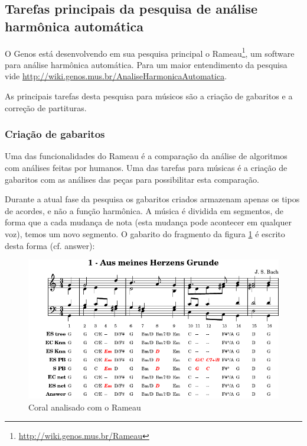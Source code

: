 \documentclass[12pt,brazil]{book}
\begin{document}
\subsection{Tarefas principais da pesquisa de análise harmônica automática}
\label{sec:taref-princ-da}

O Genos está desenvolvendo em sua pesquisa principal o
Rameau\footnote{\url{http://wiki.genos.mus.br/Rameau}}, um software
para análise harmônica automática. Para um maior entendimento da
pesquisa vide
\url{http://wiki.genos.mus.br/AnaliseHarmonicaAutomatica}.

As principais tarefas desta pesquisa para músicos são a criação de
gabaritos e a correção de partituras.

\subsubsection{Criação de gabaritos}
\label{sec:criacao-de-gabaritos}

Uma das funcionalidades do Rameau é a comparação da análise de
algoritmos com análises feitas por humanos. Uma das tarefas para
músicas é a criação de gabaritos com as análises das peças para
possibilitar esta comparação.

Durante a atual fase da pesquisa os gabaritos criados armazenam apenas
os tipos de acordes, e não a função harmônica. A música é dividida em
segmentos, de forma que a cada mudança de nota (esta mudança pode
acontecer em qualquer voz), temos um novo segmento. O gabarito do
fragmento da figura \ref{fig:choral-rameau} é escrito desta forma
(cf. answer):

\begin{figure}
  \centering
  \includegraphics[scale=.8]{analysis-001}
  \caption{Coral analisado com o Rameau}
  \label{fig:choral-rameau}
\end{figure}
\end{document}
